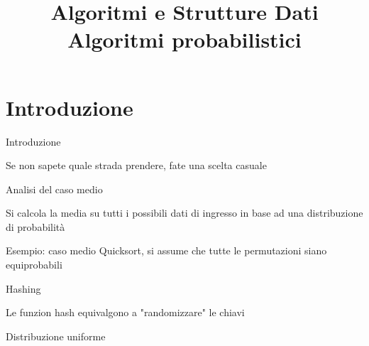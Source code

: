 
\title[ASD - Algoritmi probabilistici]{\textbf{Algoritmi e Strutture Dati}\\[24pt]Algoritmi probabilistici}

\usepackage[mode=buildnew]{standalone}
\usepackage{xcolor}
\usepackage{colortbl}
\usepackage{epigraph}
\usepackage{tikz}
\usepackage{xmpmulti}
\usepackage{listings}


\newcommand{\R}[1]{\textcolor{red}{#1}}
\newcommand{\B}[1]{\textcolor{blue}{#1}}

\renewcommand{\Primo}{\mathit{start}\xspace}
\renewcommand{\Ultimo}{\mathit{end}\xspace}

\renewcommand{\arraystretch}{1.4}
\graphicspath{{figs/17/}}





\FrameTitle{}

\FrameContent



\section{Introduzione}

\begin{frame}{Introduzione}

\vspace{-9pt}
\BIL
\item Se non sapete quale strada prendere, fate una scelta casuale
\EIL

\BIL
\item Analisi del caso medio
  \BI
  \item Si calcola la media su tutti i possibili dati di ingresso
  in base ad una distribuzione di probabilità
  \item Esempio: caso medio Quicksort, si assume che tutte 
  le permutazioni siano equiprobabili
  \EI
\item Hashing
  \BI 
  \item Le funzion hash equivalgono a "randomizzare" le chiavi
  \item Distribuzione uniforme
  \EI
\EIL

\end{frame}

